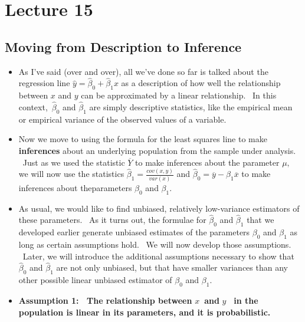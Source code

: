 \documentclass[11pt]{article}
\begin{document}
\section{Lecture 15}

\subsection{Moving from Description to Inference}

\begin{itemize}
\item As I've said (over and over), all we've done so far is talked about
the regression line $\widehat{y}=\widehat{\beta }_{0}+\widehat{\beta }_{1}x$
as a description of how well the relationship between $x$ and $y$ can be
approximated by a linear relationship. \ In this context,\ $\widehat{\beta }%
_{0}$ and $\widehat{\beta }_{1}$ are simply descriptive statistics, like the
empirical mean or empirical variance of the observed values of a variable.

\item Now we move to using the formula for the least squares line to make 
\textbf{inferences }about an underlying population from the sample under
analysis. \ Just as we used the statistic $\overline{Y}$ to make inferences
about the parameter $\mu ,$ we will now use the statistics $\widehat{\beta }%
_{1}=\frac{cov\left( x,y\right) }{var(x)}$ and $\widehat{\beta }_{0}=%
\overline{y}-\widehat{\beta }_{1}\overline{x}$ to make inferences about
theparameters $\beta _{0}$ and $\beta _{1}.$

\item As usual, we would like to find unbiased, relatively low-variance
estimators of these parameters$.$ \ As it turns out, the formulae for $%
\widehat{\beta }_{0}$ and $\widehat{\beta }_{1}$ that we developed earlier
generate unbiased estimates of the parameters $\beta _{0}$ and $\beta _{1}$
as long as certain assumptions hold. \ We will now develop those
assumptions. \ Later, we will introduce the additional assumptions necessary
to show that $\widehat{\beta }_{0}$ and $\widehat{\beta }_{1}$ are not only
unbiased, but that have smaller variances than any other possible linear
unbiased estimator of $\beta _{0}$ and $\beta _{1}.$

\item \textbf{Assumption 1: \ The relationship between }$x$\textbf{\ and }$y$%
\textbf{\ in the population is linear in its parameters, and it is
probabilistic. \ }


\end{itemize}
\end{document}
